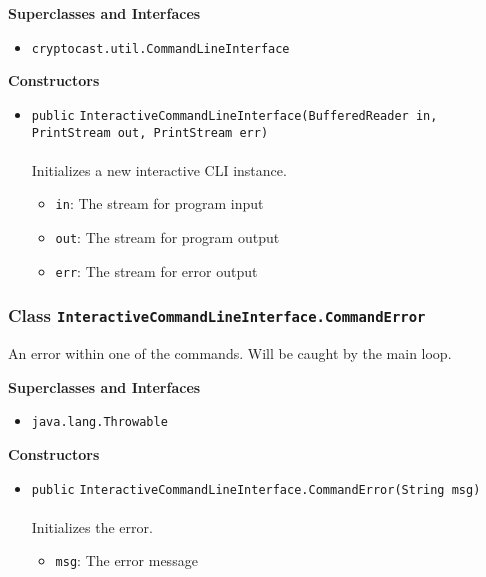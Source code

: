 \textbf{\sffamily Superclasses and Interfaces}
\begin{itemize}
\item \lstinline|cryptocast.util.CommandLineInterface|
\end{itemize}


\textbf{\sffamily Constructors}
\begin{itemize}
\item \lstinline|public| \lstinline|InteractiveCommandLineInterface|\lstinline|(BufferedReader in, PrintStream out, PrintStream err)|\\ \\[-0.6em]
Initializes a new interactive CLI instance.
\begin{itemize}
\item \lstinline|in|: The stream for program input
\item \lstinline|out|: The stream for program output
\item \lstinline|err|: The stream for error output
\end{itemize}



\end{itemize}


\subsubsection{Class \lstinline|InteractiveCommandLineInterface.CommandError|}
An error within one of the commands. Will be caught by the main loop. \\
\noindent\begin{minipage}[t]{5cm}
\vspace{0.3em}
\hspace*{2em}
\vspace{0.3em}
\end{minipage}



\textbf{\sffamily Superclasses and Interfaces}
\begin{itemize}
\item \lstinline|java.lang.Throwable|
\end{itemize}


\textbf{\sffamily Constructors}
\begin{itemize}
\item \lstinline|public| \lstinline|InteractiveCommandLineInterface.CommandError|\lstinline|(String msg)|\\ \\[-0.6em]
Initializes the error.
\begin{itemize}
\item \lstinline|msg|: The error message
\end{itemize}



\end{itemize}


